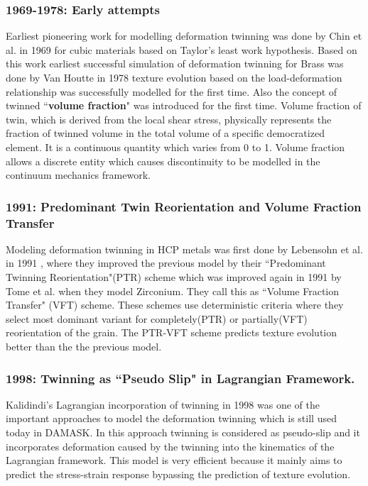 \subsubsection{1969-1978: Early attempts}
\vspace{-0.8em}
Earliest pioneering work for modelling deformation twinning was done by Chin et al. in 1969 \cite{Chin1969.0051} for cubic materials based on Taylor’s least work hypothesis\cite{taylor1938plastic}. Based on this work earliest successful simulation of deformation twinning for Brass was done by Van Houtte in 1978\cite{HOUTTE1978591} texture evolution based on the load-deformation relationship was successfully modelled for the first time. Also the concept of twinned ``\textbf{volume fraction}" was introduced for the first time. Volume fraction of twin, which is derived from the local shear stress, physically represents the fraction of twinned volume in the total volume of a specific democratized element. It is a continuous quantity which varies from 0 to 1. Volume fraction allows a discrete entity which causes discontinuity to be modelled in the continuum mechanics framework. %
\vspace{-0.8em}
\subsubsection{1991: Predominant Twin Reorientation and Volume Fraction Transfer}
\vspace{-0.8em}
Modeling deformation twinning in HCP metals was first done by Lebensohn et al. in 1991 \cite{Lebensohn1991ModellingTI}, where they improved the previous model by their ``Predominant Twinning Reorientation"(PTR) scheme which was improved again in 1991 by Tome et al.\cite{TOME19912667} when they model Zirconium. They call this as ``Volume Fraction Transfer" (VFT) scheme. These schemes use deterministic criteria where they select most dominant variant for completely(PTR) or partially(VFT) reorientation of the grain. The PTR-VFT scheme predicts texture evolution better than the the previous model.
\vspace{-0.8em}
\subsubsection{1998: Twinning as ``Pseudo Slip" in Lagrangian Framework.}
\vspace{-0.8em}
Kalidindi's Lagrangian incorporation of twinning\cite{KALIDINDI1998267} in 1998 was one of the important approaches to model the deformation twinning which is still used today in DAMASK. In this approach twinning is considered as pseudo-slip and it incorporates deformation caused by the twinning into the kinematics of the Lagrangian framework. This model is very efficient because it mainly aims to predict the stress-strain response bypassing the prediction of texture evolution.
\vspace{-0.8em}
